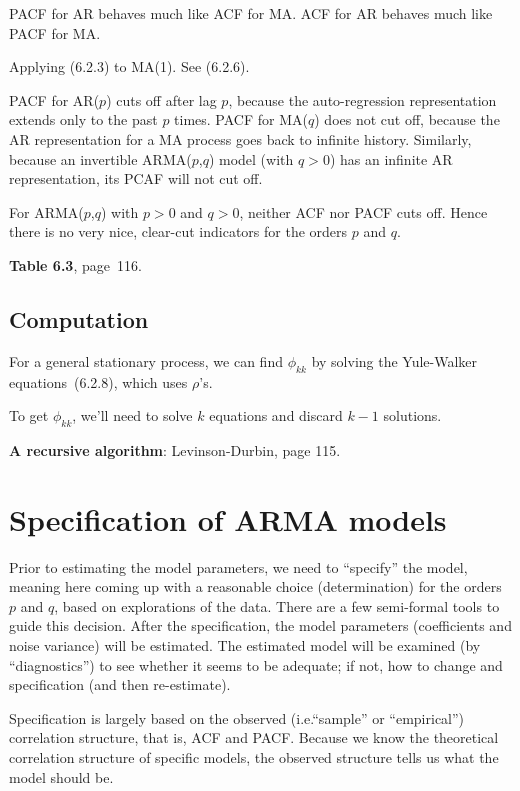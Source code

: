 \documentclass[12pt]{article}
\begin{document}
\alert
PACF for AR behaves much like ACF for MA.
ACF for AR behaves much like PACF for MA.

\example Applying (6.2.3) to MA(1). See (6.2.6).

\alert
PACF for AR($p$) cuts off after lag $p$,
because the auto-regression representation extends only to the past $p$
times.
PACF for MA($q$) does not cut off,
because the AR representation for a MA process
goes back to infinite history.
Similarly,
because an invertible ARMA($p$,$q$) model (with $q > 0$) has an infinite
AR representation, its PCAF will not cut off.

\alert
For ARMA($p$,$q$) with $p>0$ and $q>0$,
neither ACF nor PACF cuts off.
Hence there is no very nice, clear-cut indicators
for the orders $p$ and $q$.

\textbf{Table 6.3}, page~116.


\subsection{Computation}

For a general stationary process,
we can find $\phi_{kk}$ by solving
the Yule-Walker equations~(6.2.8),
which uses $\rho$'s.

\alert
To get $\phi_{kk}$,
we'll need to solve $k$ equations and discard
$k-1$ solutions.

\textbf{A recursive algorithm}: Levinson-Durbin, page 115.


\section{Specification of ARMA models}

Prior to estimating the model parameters,
we need to ``specify'' the model,
meaning here coming up with a reasonable choice (determination)
for the orders $p$ and $q$, based on explorations of the data.
There are a few semi-formal tools to guide this decision.
After the specification, the model parameters
(coefficients and noise variance) will be estimated.
The estimated model will be examined (by ``diagnostics'') to see whether
it seems to be adequate; if not, how to change and specification (and
then re-estimate).

Specification is largely based on the observed (i.e.\@ ``sample'' or
``empirical'') correlation structure, that is, ACF and PACF.
Because we know the theoretical correlation structure of specific
models, the observed structure tells us what the model should be.
\end{document}
